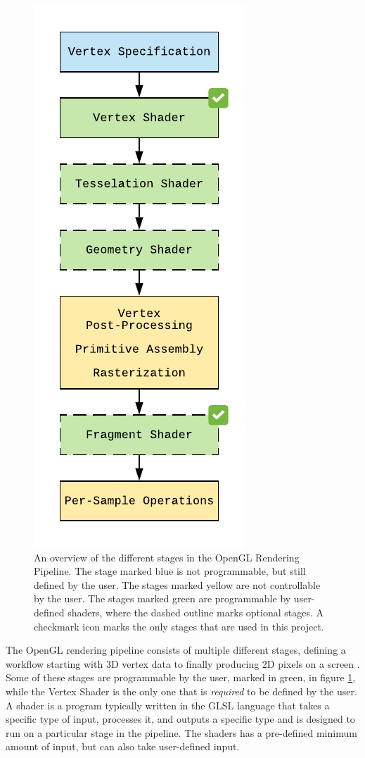 \begin{figure}[!h]
    \centering
    \includegraphics{img/theory/RenderingPipeline.pdf}
    \caption{An overview of the different stages in the OpenGL Rendering Pipeline. The stage marked blue is not programmable, but still defined by the user. The stages marked yellow are not controllable by the user. The stages marked green are programmable by user-defined shaders, where the dashed outline marks optional stages. A checkmark icon marks the only stages that are used in this project.}
    \label{fig:RenderingPipeline}
\end{figure}

The OpenGL rendering pipeline consists of multiple different stages, defining a workflow starting with 3D vertex data to finally producing 2D pixels on a screen \cite{a2019_rendering}. Some of these stages are programmable by the user, marked in green, in figure \ref{fig:RenderingPipeline}, while the Vertex Shader is the only one that is \textit{required} to be defined by the user. A shader is a program typically written in the GLSL language that takes a specific type of input, processes it, and outputs a specific type and is designed to run on a particular stage in the pipeline. The shaders has a pre-defined minimum amount of input, but can also take user-defined input.

